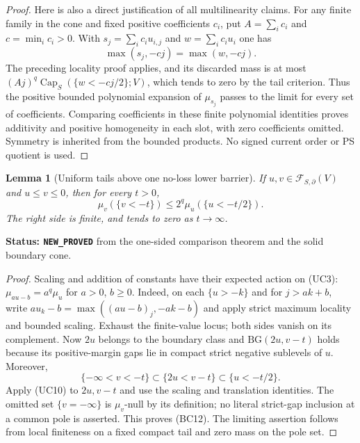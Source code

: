 \documentclass[11pt,a4paper]{article}
\numberwithin{equation}{section}
\newtheorem{lemma}[theorem]{Lemma}
\theoremstyle{definition}
\theoremstyle{remark}
\begin{document}
\begin{proof}
Here is also a direct justification of all multilinearity claims.
For any finite family in the cone and fixed positive coefficients
$c_i$, put $A=\sum_i c_i$ and $c=\min_i c_i>0$. With
$s_j=\sum_i c_i u_{i,j}$ and $w=\sum_i c_i u_i$ one has
\[
                    \max(s_j,-cj)=\max(w,-cj).
\]
The preceding locality proof applies, and its discarded mass is
at most $(Aj)^q\operatorname{Cap}_S(\{w<-cj/2\};V)$, which
tends to zero by the tail criterion. Thus the positive bounded
polynomial expansion of $\mu_{s_j}$ passes to the limit for
every set of coefficients. Comparing coefficients in these finite
polynomial identities proves additivity and positive homogeneity
in each slot, with zero coefficients omitted. Symmetry is inherited
from the bounded products. No signed current order or PS quotient
is used.
\end{proof}

\begin{lemma}[Uniform tails above one no-loss lower barrier]
\label{lem:r11-uniform-upper-tail}
If $u,v\in\mathcal F_{S,\partial}(V)$ and $u\leq v\leq0$,
then for every $t>0$,
\[
                 \mu_v(\{v<-t\})
                      \leq2^q\mu_u(\{u<-t/2\}).
 \tag{BC12}
\]
The right side is finite, and tends to zero as $t\to\infty$.
\end{lemma}

\noindent\textbf{Status: \texttt{NEW\_PROVED}} from the
one-sided comparison theorem and the solid boundary cone.

\begin{proof}
Scaling and addition of constants have their expected action on
(UC3): $\mu_{au-b}=a^q\mu_u$ for $a>0$, $b\geq0$.
Indeed, on each $\{u>-k\}$ and for $j>ak+b$, write
$au_k-b=\max((au-b)_j,-ak-b)$ and apply strict maximum
locality and bounded scaling. Exhaust the finite-value locus;
both sides vanish on its complement.
Now $2u$ belongs to the boundary class and
$\mathrm{BG}(2u,v-t)$ holds because its positive-margin gaps lie
in compact strict negative sublevels of $u$. Moreover,
\[
       \{-\infty<v<-t\}\subset\{2u<v-t\}
                                      \subset\{u<-t/2\}.
\]
Apply (UC10) to $2u,v-t$ and use the scaling and translation
identities. The omitted set $\{v=-\infty\}$ is $\mu_v$-null
by its definition; no literal strict-gap inclusion at a common
pole is asserted. This proves (BC12). The limiting assertion follows
from local finiteness on a fixed compact tail and zero mass on
the pole set.
\end{proof}
\end{document}

